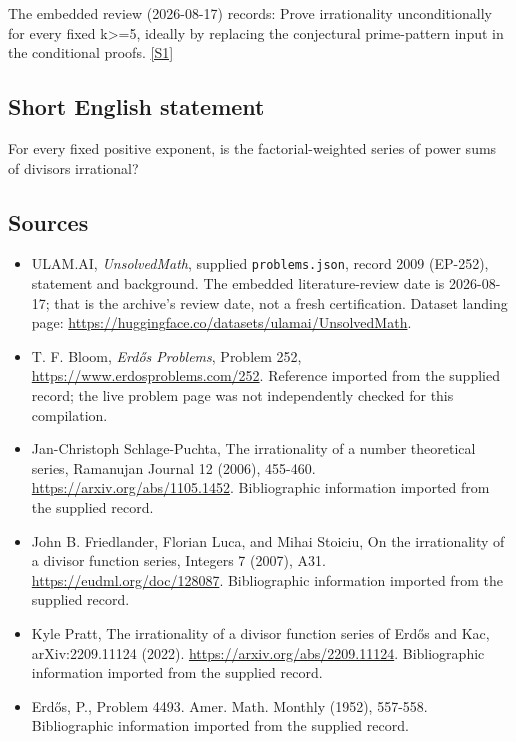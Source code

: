 \documentclass[11pt,a4paper]{article}
\newcommand{\sref}[2]{\hyperlink{source:#1:#2}{[S#2]}}
\begin{document}
The embedded review (2026-08-17) records: Prove irrationality unconditionally for every fixed k>=5, ideally by replacing the conjectural prime-pattern input in the conditional proofs. \sref{2009}{1}

\subsection{Short English statement}

For every fixed positive exponent, is the factorial-weighted series of power sums of divisors irrational?

\subsection{Sources}

{\small

\begin{itemize}

\item[\hypertarget{source:2009:1}{S1}] ULAM.AI, \emph{UnsolvedMath}, supplied \texttt{problems.json}, record 2009 (EP-252), statement and background. The embedded literature-review date is 2026-08-17; that is the archive’s review date, not a fresh certification. Dataset landing page: \url{https://huggingface.co/datasets/ulamai/UnsolvedMath}.

\item[\hypertarget{source:2009:2}{S2}] T. F. Bloom, \emph{Erdős Problems}, Problem 252, \url{https://www.erdosproblems.com/252}. Reference imported from the supplied record; the live problem page was not independently checked for this compilation.

\item[\hypertarget{source:2009:3}{S3}] Jan-Christoph Schlage-Puchta, The irrationality of a number theoretical series, Ramanujan Journal 12 (2006), 455-460. \url{https://arxiv.org/abs/1105.1452}. Bibliographic information imported from the supplied record.

\item[\hypertarget{source:2009:4}{S4}] John B. Friedlander, Florian Luca, and Mihai Stoiciu, On the irrationality of a divisor function series, Integers 7 (2007), A31. \url{https://eudml.org/doc/128087}. Bibliographic information imported from the supplied record.

\item[\hypertarget{source:2009:5}{S5}] Kyle Pratt, The irrationality of a divisor function series of Erdős and Kac, arXiv:2209.11124 (2022). \url{https://arxiv.org/abs/2209.11124}. Bibliographic information imported from the supplied record.

\item[\hypertarget{source:2009:6}{S6}] Erd\H{o}s, P., Problem 4493. Amer. Math. Monthly (1952), 557-558. Bibliographic information imported from the supplied record.

\end{itemize}

}

\label{end:2009}
\end{document}
